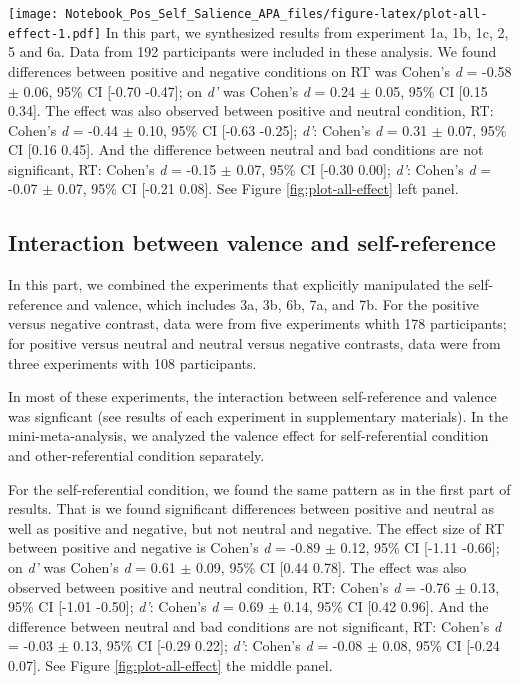 \documentclass[man]{apa6}
\begin{document}
\texttt{[image: Notebook\_Pos\_Self\_Salience\_APA\_files/figure-latex/plot-all-effect-1.pdf]}
In this part, we synthesized results from experiment 1a, 1b, 1c, 2, 5 and 6a. Data from 192 participants were included in these analysis. We found differences between positive and negative conditions on RT was Cohen's \emph{d} = -0.58 \(\pm\) 0.06, 95\% CI {[}-0.70 -0.47{]}; on \emph{d'} was Cohen's \emph{d} = 0.24 \(\pm\) 0.05, 95\% CI {[}0.15 0.34{]}. The effect was also observed between positive and neutral condition, RT: Cohen's \emph{d} = -0.44 \(\pm\) 0.10, 95\% CI {[}-0.63 -0.25{]}; \emph{d'}: Cohen's \emph{d} = 0.31 \(\pm\) 0.07, 95\% CI {[}0.16 0.45{]}. And the difference between neutral and bad conditions are not significant, RT: Cohen's \emph{d} = -0.15 \(\pm\) 0.07, 95\% CI {[}-0.30 0.00{]}; \emph{d'}: Cohen's \emph{d} = -0.07 \(\pm\) 0.07, 95\% CI {[}-0.21 0.08{]}. See Figure \ref{fig:plot-all-effect} left panel.

\hypertarget{interaction-between-valence-and-self-reference}{%
\subsection{Interaction between valence and self-reference}\label{interaction-between-valence-and-self-reference}}

In this part, we combined the experiments that explicitly manipulated the self-reference and valence, which includes 3a, 3b, 6b, 7a, and 7b. For the positive versus negative contrast, data were from five experiments whith 178 participants; for positive versus neutral and neutral versus negative contrasts, data were from three experiments with 108 participants.

In most of these experiments, the interaction between self-reference and valence was signficant (see results of each experiment in supplementary materials). In the mini-meta-analysis, we analyzed the valence effect for self-referential condition and other-referential condition separately.

For the self-referential condition, we found the same pattern as in the first part of results. That is we found significant differences between positive and neutral as well as positive and negative, but not neutral and negative. The effect size of RT between positive and negative is Cohen's \emph{d} = -0.89 \(\pm\) 0.12, 95\% CI {[}-1.11 -0.66{]}; on \emph{d'} was Cohen's \emph{d} = 0.61 \(\pm\) 0.09, 95\% CI {[}0.44 0.78{]}. The effect was also observed between positive and neutral condition, RT: Cohen's \emph{d} = -0.76 \(\pm\) 0.13, 95\% CI {[}-1.01 -0.50{]}; \emph{d'}: Cohen's \emph{d} = 0.69 \(\pm\) 0.14, 95\% CI {[}0.42 0.96{]}. And the difference between neutral and bad conditions are not significant, RT: Cohen's \emph{d} = -0.03 \(\pm\) 0.13, 95\% CI {[}-0.29 0.22{]}; \emph{d'}: Cohen's \emph{d} = -0.08 \(\pm\) 0.08, 95\% CI {[}-0.24 0.07{]}. See Figure \ref{fig:plot-all-effect} the middle panel.
\end{document}
